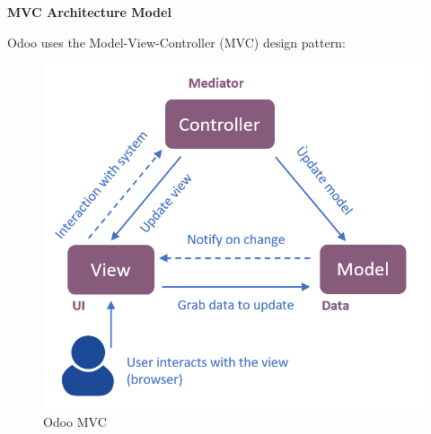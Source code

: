 \textbf{MVC Architecture Model}

Odoo uses the Model-View-Controller (MVC) design pattern:
   
\begin{figure}[h]
    \centering
    \includegraphics[width=1\textwidth]{media/odoomvc.png}
    \caption{Odoo MVC}
    \label{fig:Odoo MVC}
\end{figure}


